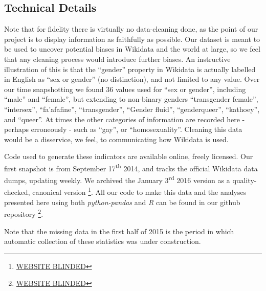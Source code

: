 \documentclass{sig-alternate-05-2015}
\begin{document}
\subsection{Technical Details}

Note that for fidelity there is virtually no data-cleaning done, as the point of our project is to display information as faithfully as possible. Our dataset is meant to be used to uncover potential biases in Wikidata and the world at large, so we feel that any cleaning process would introduce further biases. An instructive illustration of this is that the ``gender'' property in Wikidata is actually labelled in English  as ``sex or gender'' (no distinction), and not limited to any value. Over our time snapshotting we found 36 values used for ``sex or gender'', including ``male'' and ``female'', but extending to non-binary genders ``transgender female'', ``intersex'', ``fa'afafine'', ``transgender'', ``Gender fluid'',  ``genderqueer'', ``kathoey'', and ``queer''. At times the other categories of information are recorded here - perhaps erroneously - such as ``gay'', or ``homosexuality''. Cleaning this data would be a disservice, we feel, to communicating how Wikidata is used.


Code used to generate these indicators are available online, freely licensed. Our first snapshot is from September 17\textsuperscript{th} 2014, and tracks the official  Wikidata data dumps, updating weekly. We archived the January 3\textsuperscript{rd} 2016 version as a quality-checked, canonical version \footnote{\url{WEBSITE BLINDED}}. All our code to make this data and the analyses presented here using both \textit{python-pandas} and \textit{R} can be found in our github repository \footnote{\url{WEBSITE BLINDED}}.

Note that the missing data in the first half of 2015 is the period in which automatic collection of these statistics was under construction.
\end{document}
